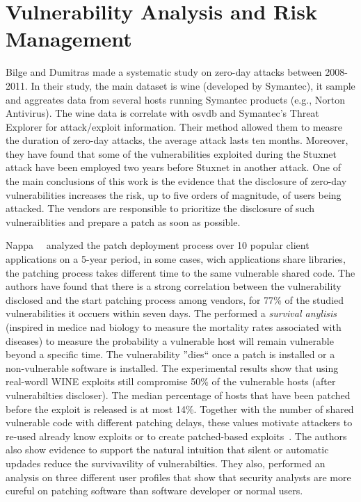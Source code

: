 \section{Vulnerability Analysis and Risk Management}

Bilge and Dumitras\cite{Bilge:2012} made a systematic study on zero-day attacks between 2008-2011.
In their study, the main dataset is \gls{wine} (developed by Symantec), it sample and aggreates data from several hosts running Symantec products (e.g., Norton Antivirus).
The \gls{wine} data is correlate with \gls{osvdb} and Symantec's Threat Explorer for attack/exploit information.
Their method allowed them to measre the duration of zero-day attacks, the average attack lasts ten months. 
Moreover, they have found that some of the vulnerabilities exploited during the Stuxnet attack have been employed two years before Stuxnet in another attack.
One of the main conclusions of this work is the evidence that the disclosure of zero-day vulnerabilities increases the risk, up to five orders of magnitude, of users being attacked.
The vendors are responsible to prioritize the disclosure of such vulneraiblities and prepare a patch as soon as possible. 

Nappa~\etal{}~\cite{Nappa:2015} analyzed the patch deployment process over 10 popular client applications on a 5-year period, in some cases, wich applications share libraries, the patching process takes different time to the same vulnerable shared code. 
The authors have found that there is a strong correlation between the vulnerability disclosed and the start patching process among vendors, for 77\% of the studied vulnerabilities it occuers within seven days. 
The performed a \emph{survival anylisis} (inspired in medice nad biology to measure the mortality rates associated with diseases) to measure the probability a vulnerable host will remain vulnerable beyond a specific time.
The vulnerability ''dies`` once a patch is installed or a non-vulnerable software is installed.
The experimental results show that using real-wordl WINE exploits still compromise 50\% of the vulnerable hosts (after vulnerabilties discloser). 
The median percentage of hosts that have been patched before the exploit is released is at most 14\%.
Together with the number of shared vulnerable code with different patching delays, these values motivate attackers to re-used already know exploits or to create patched-based exploits~\cite{Brumley:2008}.
The authors also show evidence to support the natural intuition that silent or automatic updades reduce the survivavility of vulnerabilties. 
They also, performed an analysis on three different user profiles that show that security analysts are more cureful on patching software than software developer or normal users.

